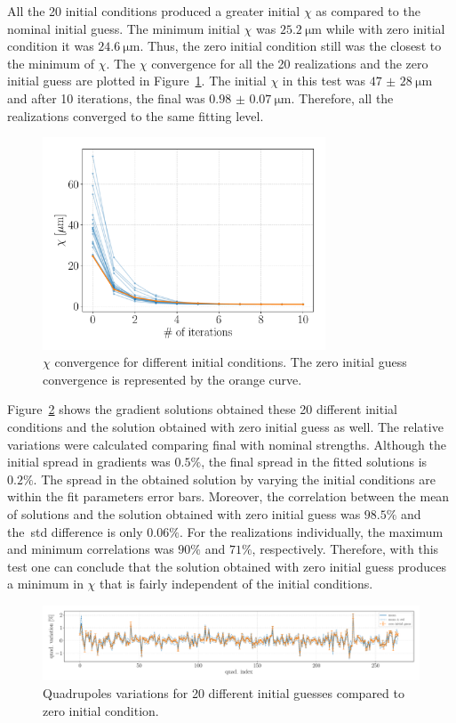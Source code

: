 All the 20 initial conditions produced a greater initial $\chi$ as compared to the nominal initial guess. The minimum initial $\chi$ was $\SI{25.2}{\micro\meter}$ while with zero initial condition it was $\SI{24.6}{\micro\meter}$. Thus, the zero initial condition still was the closest to the minimum of $\chi$. The $\chi$ convergence for all the 20 realizations and the zero initial guess are plotted in Figure~\ref{fig:chi_ini_guess}. The initial $\chi$ in this test was $\SI{47(28)}{\micro\meter}$ and after 10 iterations, the final was $\SI{0.98(7)}{\micro\meter}$. Therefore, all the realizations converged to the same fitting level.
\begin{figure}[h!]
\centering
\includegraphics[width=0.75\textwidth]{figures/chi_convergence_initial_guess.pdf}
\caption{$\chi$ convergence for different initial conditions. The zero initial guess convergence is represented by the orange curve.}
\label{fig:chi_ini_guess}
\end{figure}

Figure~\ref{fig:quad_stren_ini_guess} shows the gradient solutions obtained these 20 different initial conditions and the solution obtained with zero initial guess as well. The relative variations were calculated comparing final with nominal strengths. Although the initial spread in gradients was $0.5\%$, the final spread in the fitted solutions is $0.2\%$. The spread in the obtained solution by varying the initial conditions are within the fit parameters error bars. Moreover, the correlation between the mean of solutions and the solution obtained with zero initial guess was $98.5\%$ and the~\gls{std} difference is only $0.06\%$. For the realizations individually, the maximum and minimum correlations was $90\%$ and $71\%$, respectively. Therefore, with this test one can conclude that the solution obtained with zero initial guess produces a minimum in $\chi$ that is fairly independent of the initial conditions.
\begin{figure}
\centering
\includegraphics[width=1.0\textwidth]{figures/quad_stren_initial_guess.pdf}
\caption{Quadrupoles variations for 20 different initial guesses compared to zero initial condition.}
\label{fig:quad_stren_ini_guess}
\end{figure}
